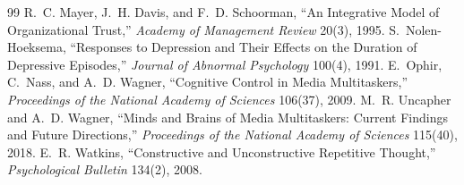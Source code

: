\documentclass[11pt]{article}
\theoremstyle{definition}
\begin{document}
\begin{thebibliography}{99}
 R.~C. Mayer, J.~H. Davis, and F.~D. Schoorman, ``An Integrative Model of Organizational Trust,'' \emph{Academy of Management Review} 20(3), 1995.
 S.~Nolen-Hoeksema, ``Responses to Depression and Their Effects on the Duration of Depressive Episodes,'' \emph{Journal of Abnormal Psychology} 100(4), 1991.
 E.~Ophir, C.~Nass, and A.~D. Wagner, ``Cognitive Control in Media Multitaskers,'' \emph{Proceedings of the National Academy of Sciences} 106(37), 2009.
 M.~R. Uncapher and A.~D. Wagner, ``Minds and Brains of Media Multitaskers: Current Findings and Future Directions,'' \emph{Proceedings of the National Academy of Sciences} 115(40), 2018.
 E.~R. Watkins, ``Constructive and Unconstructive Repetitive Thought,'' \emph{Psychological Bulletin} 134(2), 2008.
\end{thebibliography}
\end{document}
